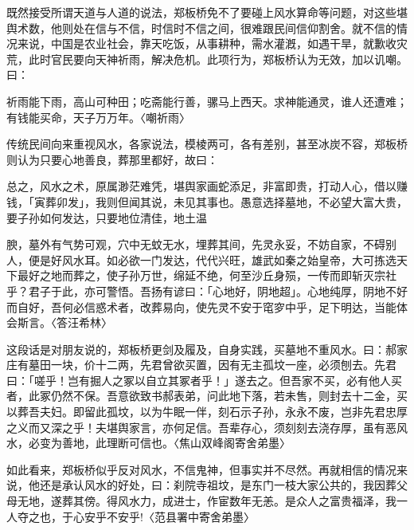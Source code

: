 既然接受所谓天道与人道的说法，郑板桥免不了要碰上风水算命等问题，对这些堪舆术数，他则处在信与不信，时信时不信之间，很难跟民间信仰割舍。就不信的情况来说，中国是农业社会，靠天吃饭，从事耕种，需水灌漑，如遇干旱，就歉收灾荒，此时官民要向天神祈雨，解决危机。此项行为，郑板桥认为无效，加以讥嘲。曰：

\begin{BookQuote}
祈雨能下雨，高山可种田；吃斋能行善，骡马上西天。求神能通灵，谁人还遭难；有钱能买命，天子万万年。〈嘲祈雨〉
\end{BookQuote}

传统民间向来重视风水，各家说法，模棱两可，各有差别，甚至冰炭不容，郑板桥则认为只要心地善良，葬那里都好，故曰：

\begin{BookQuote}
总之，风水之术，原属渺茫难凭，堪舆家画蛇添足，非富即贵，打动人心，借以赚钱，「寅葬卯发」，我则但闻其说，未见其事也。愚意选择墓地，不必望大富大贵，要子孙如何发达，只要地位清佳，地土温
\end{BookQuote}

\vfill
\begin{BookNotes}
\end{BookNotes}

\noindent 腴，墓外有气势可观，穴中无蚊无水，埋葬其间，先灵永妥，不妨自家，不碍别人，便是好风水耳。如必欲一门发达，代代兴旺，雄武如秦之始皇帝，大可拣选天下最好之地而葬之，使子孙万世，绵延不绝，何至沙丘身殒，一传而即斩灭宗社乎？君子于此，亦可警悟。吾扬有谚曰：「心地好，阴地超」。心地纯厚，阴地不好而自好，吾何必信惑术者，改葬易向，使先灵不安于窀穸中乎，足下明达，当能体会斯言。〈答汪希林〉

这段话是对朋友说的，郑板桥更剑及履及，自身实践，买墓地不重风水。曰：郝家庄有墓田一块，价十二两，先君曾欲买置，因有无主孤坟一座，必须刨去。先君曰：「嗟乎！岂有掘人之冢以自立其冢者乎！」遂去之。但吾家不买，必有他人买者，此冢仍然不保。吾意欲致书郝表弟，问此地下落，若未售，则封去十二金，买以葬吾夫妇。即留此孤坟，以为牛眠一伴，刻石示子孙，永永不废，岂非先君忠厚之义而又深之乎！夫堪舆家言，亦何足信。吾辈存心，须刻刻去浇存厚，虽有恶风水，必变为善地，此理断可信也。〈焦山双峰阁寄舍弟墨〉

如此看来，郑板桥似乎反对风水，不信鬼神，但事实并不尽然。再就相信的情况来说，他还是承认风水的好处，曰：刹院寺祖坟，是东门一枝大家公共的，我因葬父母无地，遂葬其傍。得风水力，成进士，作宦数年无恙。是众人之富贵福泽，我一人夺之也，于心安乎不安乎!〈范县署中寄舍弟墨〉

